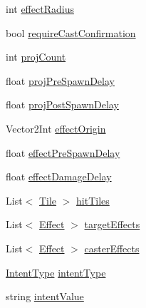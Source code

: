 \begin{DoxyCompactItemize}
\item 
int \mbox{\hyperlink{class_spell_a7af1a010c8b8bff70bba88de6f474c1b}{effect\+Radius}}
\item 
bool \mbox{\hyperlink{class_spell_a0b207b63bd2f3bf16543af1252bbcc7b}{require\+Cast\+Confirmation}}
\item 
int \mbox{\hyperlink{class_spell_a1f1ffc008aa15b87555869f751d0563b}{proj\+Count}}
\item 
float \mbox{\hyperlink{class_spell_a960bdb4e2ddb566e01ebd89ce94e383e}{proj\+Pre\+Spawn\+Delay}}
\item 
float \mbox{\hyperlink{class_spell_a6d4dcdd18169a089f548b332d36f93bc}{proj\+Post\+Spawn\+Delay}}
\item 
Vector2\+Int \mbox{\hyperlink{class_spell_a05deca8c2c600bb4d7c06df0b0d4df41}{effect\+Origin}}
\item 
float \mbox{\hyperlink{class_spell_a99825dc703050936c87a7b8b02f3539d}{effect\+Pre\+Spawn\+Delay}}
\item 
float \mbox{\hyperlink{class_spell_a7f6820ee9c92e780cc1938addd9e6793}{effect\+Damage\+Delay}}
\item 
List$<$ \mbox{\hyperlink{class_tile}{Tile}} $>$ \mbox{\hyperlink{class_spell_abf3b41d24f9983b5d6a970e17379a05c}{hit\+Tiles}}
\item 
List$<$ \mbox{\hyperlink{class_effect}{Effect}} $>$ \mbox{\hyperlink{class_spell_a473e9f79ee07b38f43ea942deb6d8c20}{target\+Effects}}
\item 
List$<$ \mbox{\hyperlink{class_effect}{Effect}} $>$ \mbox{\hyperlink{class_spell_a4e1ab6af2261882a87a0cb60a944306f}{caster\+Effects}}
\item 
\mbox{\hyperlink{class_spell_a602b82de554076b542544262e7a95f19}{Intent\+Type}} \mbox{\hyperlink{class_spell_abe2debb79464b4f7a9985005efe98ecb}{intent\+Type}}
\item 
string \mbox{\hyperlink{class_spell_a0829aca41b73bbbd14adea27fc373c80}{intent\+Value}}
\end{DoxyCompactItemize}


